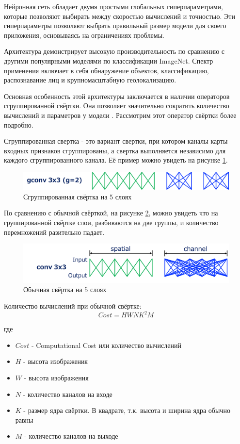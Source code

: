 Нейронная сеть обладает двумя простыми глобальных гиперпараметрами, которые позволяют выбирать между скоростью вычислений и точностью. Эти гиперпараметры позволяют выбрать правильный размер модели для своего приложения, основываясь на ограничениях проблемы. 

Архитектура демонстрирует высокую производительность по сравнению с другими популярными моделями по классификации ImageNet. Спектр применения включает в себя обнаружение объектов, классификацию, распознавание лиц и крупномасштабную геолокализацию.\cite{mobilenet}

Основная особенность этой архитектуры заключается в наличии операторов сгруппированной свёртки. Она позволяет значительно сократить количество вычислений и параметров у модели \cite{xception}. Рассмотрим этот оператор свёртки более подробно.

Сгруппированная свертка - это вариант свертки, при котором каналы карты входных признаков сгруппированы, а свертка выполняется независимо для каждого сгруппированного канала. Её пример можно увидеть на рисунке \ref{fig:gconv}.

\begin{figure}[ht]
    \centering
    \includegraphics[width=\textwidth*2/3]{images/gconv.png}
    \caption{Сгруппированная свёртка на 5 слоях}
    \label{fig:gconv}
\end{figure}

По сравнению с обычной свёрткой, на рисунке \ref{fig:normal_conv}, можно увидеть что на группированной свёртке слои, разбиваются на две группы, и количество перемножений разительно падает.

\begin{figure}[ht]
    \centering
    \includegraphics[width=\textwidth*2/3]{images/normal_conv.png}
    \caption{Обычная свёртка на 5 слоях}
    \label{fig:normal_conv}
\end{figure}

Количество вычислений при обычной свёртке:
\[
    Cost = HWNK^2M
\]

где
\begin{itemize}
    \item $Cost$ - Computational Cost или количество вычислений
    \item $H$ - высота изображения
    \item $W$ - высота изображения
    \item $N$ - количество каналов на входе
    \item $K$ - размер ядра свёртки. В квадрате, т.к. высота и ширина ядра обычно равны
    \item $M$ - количество каналов на выходе
\end{itemize}


